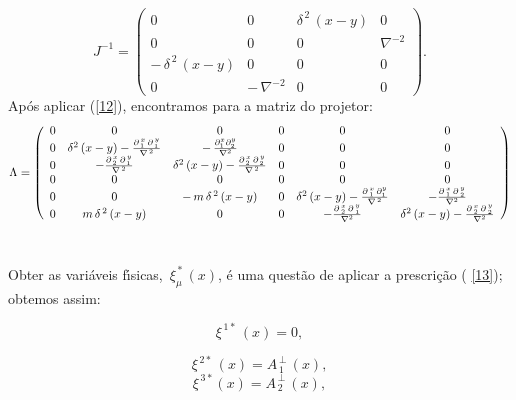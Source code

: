 \documentclass[a4paper,thmsa,12pt]{report}
\begin{document}
\begin{equation}
J^{-1}=\left( 
\begin{array}{cccc}
0 & 0 & \delta ^{\,2}\,\left( x-y\right)  & 0 \\ 
0 & 0 & 0 & \nabla ^{-2} \\ 
-\,\delta ^{\,2}\,\left( x-y\right)  & 0 & 0 & 0 \\ 
0 & -\,\nabla ^{-2} & 0 & 0
\end{array}
\right) .  \label{334}
\end{equation}
\medskip Ap\'{o}s aplicar (\ref{12}), encontramos para a matriz do
projetor:\ \ 
\begin{equation}
\Lambda =\left( 
\begin{array}{cccccc}
0 & 0 & 0 & 0 & 0 & 0 \\ 
0 & \delta ^{2}\left( x-y\right) -\frac{\partial _{\,1}^{\,x}\,\partial
_{\,1}^{\,y}}{\nabla ^{\,2}} & -\,\frac{\partial _{1}^{x}\partial _{2}^{y}}{%
\nabla ^{2}} & 0 & 0 & 0 \\ 
0 & -\frac{\partial _{\,2}^{\,x}\,\partial _{\,1}^{\,y}}{\nabla ^{\,2}} & 
\delta ^{2}\left( x-y\right) -\frac{\partial _{\,2}^{\,x}\,\partial
_{\,2}^{\,y}}{\nabla ^{\,2}} & 0 & 0 & 0 \\ 
0 & 0 & 0 & 0 & 0 & 0 \\ 
0 & 0 & -\,m\,\delta ^{\,2}\left( x-y\right)  & 0 & \delta ^{2}\left(
x-y\right) -\frac{\partial \,_{1}^{x}\,\partial _{1}^{y}}{\nabla ^{\,2}} & -%
\frac{\partial \,_{1}^{x}\,\partial \,_{2}^{y}}{\nabla ^{2}} \\ 
0 & m\,\delta ^{\,2}\left( x-y\right)  & 0 & 0 & -\frac{\partial
\,_{2}^{x}\,\partial \,_{1}^{y}}{\nabla ^{2}} & \delta ^{2}\left( x-y\right)
-\frac{\partial \,_{2}^{x}\,\partial \,_{2}^{y}}{\nabla ^{2}}
\end{array}
\right)   \label{335}
\end{equation}
\ \ \ \ \ \ \ \ \ \ \ \ \ \ \ \ \ \ \ \ \ \ \ \ \ \ \ \ \ \ \ \ \ \ \ \ \ \
\ \ \ \ \ \ \ \ \bigskip \medskip\ \bigskip 

Obter as vari\'{a}veis f\'{\i}sicas,\thinspace\ $\xi _{\mu }^{\,\ast
}\,\left( x\right) $, \'{e} uma quest\~{a}o de aplicar a prescri\c{c}\~{a}o (%
\ref{13}); obtemos assim:\ \ 

\begin{equation}
\xi ^{\,1\ast }\,\left( x\right) =0,  \label{336.a}
\end{equation}

\begin{equation}
\xi ^{\,2\ast }\,\left( x\right) =A_{\,1}^{\,\perp }\,\left( x\right) ,
\label{336.b}
\end{equation}
\begin{equation}
\xi ^{\,3\ast }\left( x\right) =A_{\,2}^{\,\perp }\,\left( x\right) ,
\label{336.c}
\end{equation}
\end{document}
